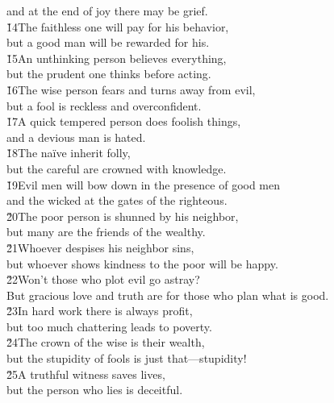 \begin{poetry}
\poemll    and at the end of joy there may be grief. \\
\poeml \v{14}The faithless one will pay for his behavior, \\
\poemll    but a good man will be rewarded for his. \\
\poeml \v{15}An unthinking person believes everything, \\
\poemll    but the prudent one thinks before acting. \\
\poeml \v{16}The wise person fears and turns away from evil, \\
\poemll    but a fool is reckless and overconfident. \\
\poeml \v{17}A quick tempered person does foolish things, \\
\poemll    and a devious man is hated. \\
\poeml \v{18}The na\"{i}ve inherit folly, \\
\poemll    but the careful are crowned with knowledge. \\
\poeml \v{19}Evil men will bow down in the presence of good men \\
\poemll    and the wicked at the gates of the righteous. \\
\poeml \v{20}The poor person is shunned by his neighbor, \\
\poemll    but many are the friends of the wealthy. \\
\poeml \v{21}Whoever despises his neighbor sins, \\
\poemll    but whoever shows kindness to the poor will be happy. \\
\poeml \v{22}Won't those who plot evil go astray? \\
\poemll    But gracious love and truth are for those who plan what is good. \\
\poeml \v{23}In hard work there is always profit, \\
\poemll    but too much chattering leads to poverty. \\
\poeml \v{24}The crown of the wise is their wealth, \\
\poemll    but the stupidity of fools is just that---stupidity! \\
\poeml \v{25}A truthful witness saves lives, \\
\poemll    but the person who lies is deceitful. \\

\end{poetry}

